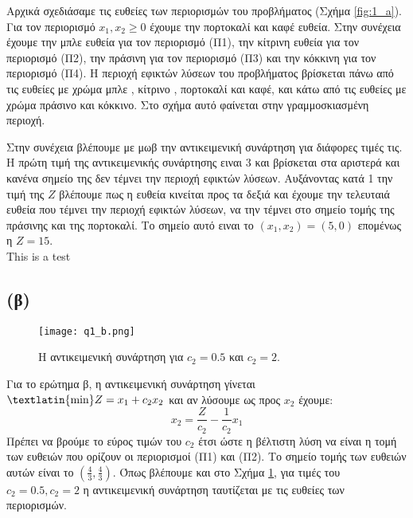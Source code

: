 \documentclass[12pt]{report}
\begin{document}
Αρχικά σχεδιάσαμε τις ευθείες των περιορισμών του προβλήματος (Σχήμα
\ref{fig:1_a}). Για τον περιορισμό
$ {x_1 , x_2 \geq 0} $ έχουμε την πορτοκαλί και καφέ ευθεία. Στην συνέχεια
έχουμε την μπλε ευθεία για τον
περιορισμό (Π1), την κίτρινη ευθεία για τον περιορισμό (Π2), την πράσινη για
τον περιορισμό (Π3) και την
κόκκινη για τον περιορισμό (Π4). Η περιοχή εφικτών λύσεων του προβλήματος
βρίσκεται πάνω από τις ευθείες με χρώμα
μπλε , κίτρινο , πορτοκαλί και καφέ, και κάτω από τις ευθείες με χρώμα πράσινο
και κόκκινο. Στο σχήμα αυτό
φαίνεται στην γραμμοσκιασμένη περιοχή.

Στην συνέχεια βλέπουμε με μωβ την αντικειμενική συνάρτηση για διάφορες τιμές
τις. Η πρώτη τιμή της αντικειμενικής
συνάρτησης ειναι 3 και βρίσκεται στα αριστερά και κανένα σημείο της δεν τέμνει
την περιοχή εφικτών λύσεων.
Αυξάνοντας κατά 1 την τιμή της $ Z $ βλέπουμε πως η ευθεία κινείται προς τα
δεξιά και έχουμε την τελευταιά ευθεία
που τέμνει την περιοχή εφικτών λύσεων, να την τέμνει στο σημείο τομής της
πράσινης και της πορτοκαλί.
Το σημείο αυτό ειναι το $ {(x_1 , x_2) = (5 , 0)} $ επομένως η $ Z = 15 $. \\
This is a test
\subsection*{(β)}
\begin{figure}[h]
    \texttt{[image: q1\_b.png]}
    \caption{Η αντικειμενική συνάρτηση για $c_2 = 0.5$ και $ c_2 = 2$.}
    \label{fig:1_b}
\end{figure}
Για το ερώτημα β, η αντικειμενική συνάρτηση γίνεται $ \text{\textlatin{min}} Z
    = x_1 + c_2x_2 $ και αν λύσουμε
ως προς $x_2$ έχουμε: $$ x_2 = \frac{Z}{c_2} - \frac{1}{c_2} x_1 $$
Πρέπει να βρούμε το εύρος τιμών του $c_2$ έτσι ώστε η βέλτιστη λύση να είναι η
τομή των ευθειών που ορίζουν οι
περιορισμοί (Π1) και (Π2). Το σημείο τομής των ευθειών αυτών είναι το
$(\frac{4}{3}, \frac{4}{3})$. Όπως
βλέπουμε και στο Σχήμα \ref{fig:1_b}, για τιμές του $c_2 = 0.5 , c_2 = 2$ η
αντικειμενική συνάρτηση ταυτίζεται
με τις ευθείες των περιορισμών.
\end{document}
